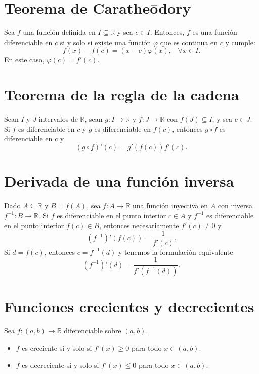 \documentclass{article}
\begin{document}
\section*{Teorema de Caratheōdory}

Sea $f$ una función definida en $I\subseteq \mathbb{R}$ y sea $c\in I$. Entonces, $f$ es una función diferenciable en $c$ si y solo si existe una función $\varphi$ que es continua en $c$ y cumple:
$$f(x)-f(c)=(x-c)\varphi(x),\hspace{10pt} \forall x\in I.$$
En este caso, $\varphi(c)=f'(c)$.

\section*{Teorema de la regla de la cadena}

Sean $I$ y $J$ intervalos de $\mathbb{R}$, sean $g:I\to\mathbb{R}$ y $f:J\to\mathbb{R}$ con $f(J)\subseteq I$, y sea $c\in J$. Si $f$ es diferenciable en $c$ y $g$ es diferenciable en $f(c)$, entonces $g\circ f$ es diferenciable en $c$ y
$$(g\circ f)'(c)=g'(f(c))f'(c).$$

\section*{Derivada de una función inversa}

Dado $A\subseteq\mathbb{R}$ y $B=f(A)$, sea $f:A\to\mathbb{R}$ una función inyectiva en $A$ con inversa $f^{-1}:B\to\mathbb{R}$. Si $f$ es diferenciable en el punto interior $c\in A$ y $f^{-1}$ es diferenciable en el punto interior $f(c)\in B$, entonces necesariamente $f'(c)\neq 0$ y
$$(f^{-1})'(f(c))=\frac{1}{f'(c)}.$$
Si $d=f(c)$, entonces $c=f^{-1}(d)$ y tenemos la formulación equivalente
$$(f^{-1})'(d)=\frac{1}{f'(f^{-1}(d))}.$$

\section*{Funciones crecientes y decrecientes}

Sea $f:(a,b)\to\mathbb{R}$ diferenciable sobre $(a,b)$.

\begin{itemize}

\item $f$ es creciente si y solo si $f'(x)\geq 0$ para todo $x\in(a,b)$.

\item $f$ es decreciente si y solo si $f'(x)\leq 0$ para todo $x\in(a,b)$.

\end{itemize}
\end{document}
